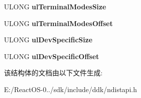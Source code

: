 \begin{DoxyCompactItemize}
U\+L\+O\+NG {\bfseries ul\+Terminal\+Modes\+Size}
\item 
\mbox{\label{struct___l_i_n_e___c_a_l_l___i_n_f_o_a64682571b3e6abd78f368f460a498a36}} 
U\+L\+O\+NG {\bfseries ul\+Terminal\+Modes\+Offset}
\item 
\mbox{\label{struct___l_i_n_e___c_a_l_l___i_n_f_o_ac74c05740457d82c78d6ea7aa1af4c82}} 
U\+L\+O\+NG {\bfseries ul\+Dev\+Specific\+Size}
\item 
\mbox{\label{struct___l_i_n_e___c_a_l_l___i_n_f_o_adeae9781dc56012a0bc431ea601fcbfa}} 
U\+L\+O\+NG {\bfseries ul\+Dev\+Specific\+Offset}
\end{DoxyCompactItemize}


该结构体的文档由以下文件生成\+:\begin{DoxyCompactItemize}
\item 
E\+:/\+React\+O\+S-\/0../sdk/include/ddk/ndistapi.\+h\end{DoxyCompactItemize}
